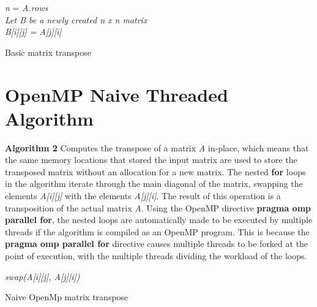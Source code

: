 \documentclass[11pt]{IEEEtran}
\begin{document}
\begin{algorithm}[H]
 
 \emph{n} = \emph{A.rows} \\
 \emph{Let B be a newly created n x n matrix} \\
 {
   {
    {
     \emph{B[i][j] = A[j][i]}
    }
   }
 }
 \caption{Basic matrix transpose}
\end{algorithm}


\section{OpenMP Naive Threaded Algorithm}

\noindent
\textbf{Algorithm 2} Computes the transpose of a matrix \emph{A} in-place, which means that the same memory locations that stored the input matrix are used to store the transposed matrix without an allocation for a new matrix. The nested \textbf{for} loops in the algorithm iterate through the main diagonal of the matrix, swapping the elements \emph{A[i][j]} with the elements \emph{A[j][i]}. The result of this operation is a transposition of the actual matrix \emph{A}. Using the OpenMP directive \textbf{pragma omp parallel for}, the nested loops are automatically made to be executed by multiple threads if the algorithm is compiled as an OpenMP program. This is because the \textbf{pragma omp parallel for} directive causes multiple threads to be forked at the point of execution, with the multiple threads dividing the workload of the loops.

\begin{algorithm}[H]
 {
    {
       \emph{swap(A[i][j], A[j][i])}
    }
 }
   
 \caption{Naive OpenMp matrix transpose}
 
\end{algorithm}
\end{document}
